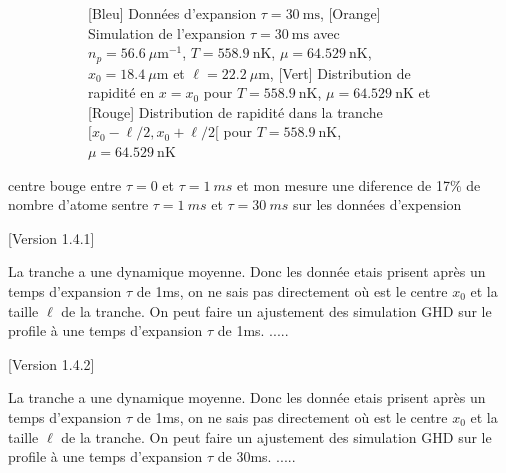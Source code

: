 \documentclass[a3, 10pt,twoside]{article}          %
\theoremstyle{plain}
\theoremstyle{definition}
\theoremstyle{remark}
\theoremstyle{definition} %
\begin{document}
\begin{figure}[H]
\begin{subfigure}[b]{0.45\textwidth}
        \caption{{\color{blue}[Bleu] Données d'expansion $\tau = 30~\text{ms}$}, {\color{orange}[Orange] Simulation de l'expansion $\tau = 30~\text{ms}$ avec $n_p = 56.6~\mu \text{m}^{-1}$, $T = 558.9~\text{nK}$, $\mu = 64.529~\text{nK}$, $x_0 = 18.4~\mu \text{m}$ et $\ell = 22.2~\mu \text{m}$}, {\color{OliveGreen}[Vert] Distribution de rapidité en $x = x_0$ pour $T = 558.9~\text{nK}$, $\mu = 64.529~\text{nK}$} et {\color{red}[Rouge] Distribution de rapidité dans la tranche $[x_0 - \ell/2, x_0 + \ell/2[$ pour $T = 558.9~\text{nK}$, $\mu = 64.529~\text{nK}$}}
        \label{fig:expansion_30_22}
    \end{subfigure}
    \caption{}
    \label{}
\end{figure}

	 
	
	
	{\color{blue} centre bouge entre $\tau = 0$ et $\tau = 1~ms$ et mon mesure une diference de 17$\%$ de nombre d'atome sentre $\tau = 1~ms$ et $\tau = 30 ~ms$ sur les données d'expension}
	
	
	[Version 1.4.1]
	
	La tranche a une dynamique moyenne. Donc  les donnée etais prisent après un temps d'expansion $\tau$ de 1ms, on ne sais pas directement où est le centre  $x_0$ et la taille $\ell$ de la tranche.
	On peut faire un ajustement des simulation GHD sur le profile à une temps d'expansion $\tau$ de 1ms. .....
	
	[Version 1.4.2]	
	
	La tranche a une dynamique moyenne. Donc  les donnée etais prisent après un temps d'expansion $\tau$ de 1ms, on ne sais pas directement où est le centre  $x_0$ et la taille $\ell$ de la tranche.
	On peut faire un ajustement des simulation GHD sur le profile à une temps d'expansion $\tau$ de 30ms. .....
	
\end{document}

